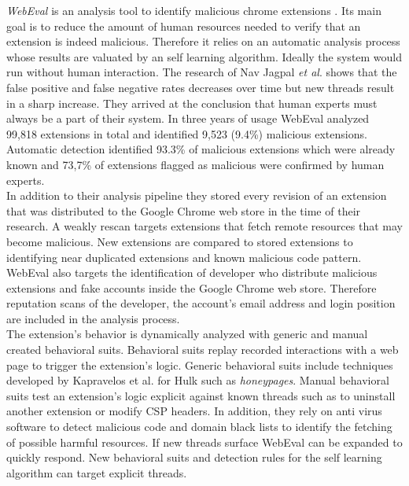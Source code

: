 	\textit{WebEval} is an analysis tool to identify malicious chrome extensions \cite{190984}. Its main goal is to reduce the amount of human resources needed to verify that an extension is indeed malicious. Therefore it relies on an automatic analysis process whose results are valuated by an self learning algorithm. Ideally the system would run without human interaction. The research of Nav Jagpal \textit{et al}. shows that the false positive and false negative rates decreases over time but new threads result in a sharp increase. They arrived at the conclusion that human experts must always be a part of their system. In three years of usage WebEval analyzed 99,818 extensions in total and identified 9,523 (9.4\%) malicious extensions. Automatic detection identified 93.3\% of malicious extensions which were already known and 73,7\% of extensions flagged as malicious were confirmed by human experts. \\
	In addition to their analysis pipeline they stored every revision of an extension that was distributed to the Google Chrome web store in the time of their research. A weakly rescan targets extensions that fetch remote resources that may become malicious. New extensions are compared to stored extensions to identifying near duplicated extensions and known malicious code pattern. WebEval also targets the identification of developer who distribute malicious extensions and fake accounts inside the Google Chrome web store. Therefore reputation scans of the developer, the account's email address and login position are included in the analysis process.  \\
	The extension's behavior is dynamically analyzed with generic and manual created behavioral suits. Behavioral suits replay recorded interactions with a web page to trigger the extension's logic. Generic behavioral suits include techniques developed by Kapravelos	et al. for Hulk \cite{184485} such as \textit{honeypages}. Manual behavioral suits test an extension's logic explicit against known threads such as to uninstall another extension or modify CSP headers. In addition, they rely on anti virus software to detect malicious code and domain black lists to identify the fetching of possible harmful resources. If new threads surface WebEval can be expanded to quickly respond. New behavioral suits and detection rules for the self learning algorithm can target explicit threads. \\
	
